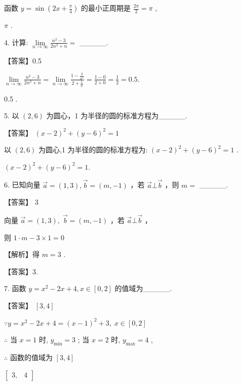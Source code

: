 \documentclass[10pt]{article}
\begin{document}
函数 \(y = \sin \left( {{2x} + \frac{\pi }{4}}\right)\) 的最小正周期是 \(\frac{2\pi }{2} = \pi\) ,

\(\pi\) .

4. 计算: \(\mathop{\lim }\limits_{{n \rightarrow  \infty }}\frac{{n}^{2} - 3}{2{n}^{2} + n} =\) \_\_\_\_\_.

【答案】0.5

\(\mathop{\lim }\limits_{{n \rightarrow  \infty }}\frac{{n}^{2} - 3}{2{n}^{2} + n} = \mathop{\lim }\limits_{{n \rightarrow  \infty }}\frac{1 - \frac{3}{{n}^{2}}}{2 + \frac{1}{n}} = \frac{1 - 0}{2 + 0} = \frac{1}{2} = {0.5}.\)

0.5 .

5. 以 \(\left( {2,6}\right)\) 为圆心，1 为半径的圆的标准方程为\_\_\_\_\_.

【答案】 \({\left( x - 2\right) }^{2} + {\left( y - 6\right) }^{2} = 1\)

以 \(\left( {2,6}\right)\) 为圆心,1 为半径的圆的标准方程为: \({\left( x - 2\right) }^{2} + {\left( y - 6\right) }^{2} = 1\) .

\({\left( x - 2\right) }^{2} + {\left( y - 6\right) }^{2} = 1.\)

6. 已知向量 \(\overrightarrow{a} = \left( {1,3}\right) ,\overrightarrow{b} = \left( {m, - 1}\right)\) ，若 \(\overrightarrow{a}\bot \overrightarrow{b}\) ，则 \(m =\) \_\_\_\_\_.

【答案】 3

向量 \(\overrightarrow{a} = \left( {1,3}\right) ,\;\overrightarrow{b} = \left( {m, - 1}\right)\) ，若 \(\overrightarrow{a} \bot  \overrightarrow{b}\) ，

则 \(1 \cdot  m - 3 \times  1 = 0\)

【解析】得 \(m = 3\) .

【答案】3.

7. 函数 \(y = {x}^{2} - {2x} + 4,x \in  \left\lbrack  {0,2}\right\rbrack\) 的值域为\_\_\_\_\_.

【答案】 \(\left\lbrack  {3,4}\right\rbrack\)

\(\because y = {x}^{2} - {2x} + 4 = {\left( x - 1\right) }^{2} + 3,\;x \in  \left\lbrack  {0,2}\right\rbrack\)

\(\therefore\) 当 \(x = 1\) 时, \({y}_{\min } = 3\) ; 当 \(x = 2\) 时, \({y}_{\max } = 4\) ,

\(\therefore\) 函数的值域为 \(\left\lbrack  {3,4}\right\rbrack\)

\(\left\lbrack  \begin{array}{ll} 3, & 4 \end{array}\right\rbrack\)
\end{document}
